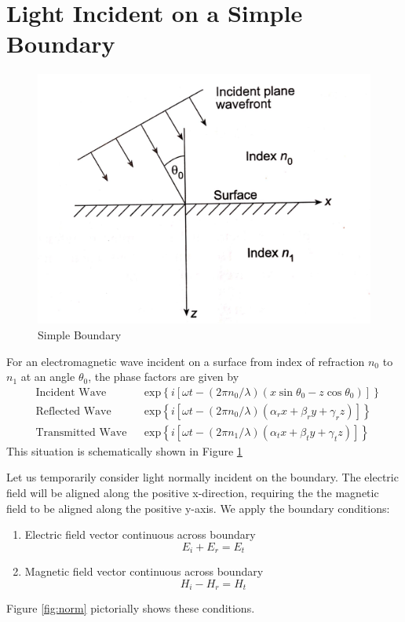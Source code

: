 \documentclass{article}
\begin{document}
\section{Light Incident on a Simple Boundary}
    \begin{figure}
        \includegraphics[width=\linewidth]{simple_boundary.png}
        \caption{Simple Boundary}
        \label{fig:simp}
    \end{figure}
    For an electromagnetic wave incident on a surface from index of refraction $n_0$ to $n_1$ at an angle $\theta_0$, the phase factors are given by
    \begin{align}
        &\text{Incident Wave} & &\mathrm{exp}\left\{ i [\omega t - (2\pi n_0 / \lambda)(x \sin \theta_0 - z \cos \theta_0)]\right\} \\
        &\text{Reflected Wave} & &\mathrm{exp}\left\{ i [\omega t - (2\pi n_0 / \lambda)(\alpha_r x + \beta_r y + \gamma_r z)]\right\} \\
        &\text{Transmitted Wave} & &\mathrm{exp}\left\{ i [\omega t - (2\pi n_1 / \lambda)(\alpha_t x + \beta_t y + \gamma_t z)]\right\}
    \end{align}
    This situation is schematically shown in Figure \ref{fig:simp}

    Let us temporarily consider light normally incident on the boundary. The electric field will be aligned along the positive x-direction, requiring the the magnetic field to be aligned along the positive y-axis. We apply the boundary conditions:
    \begin{enumerate}
        \item Electric field vector continuous across boundary
        \begin{equation}
            E_i + E_r = E_t
        \end{equation} 
        \item Magnetic field vector continuous across boundary
        \begin{equation}
            H_i - H_r = H_t
            \label{eq:magcont}
        \end{equation}
    \end{enumerate}
    Figure \ref{fig:norm} pictorially shows these conditions.
\end{document}
